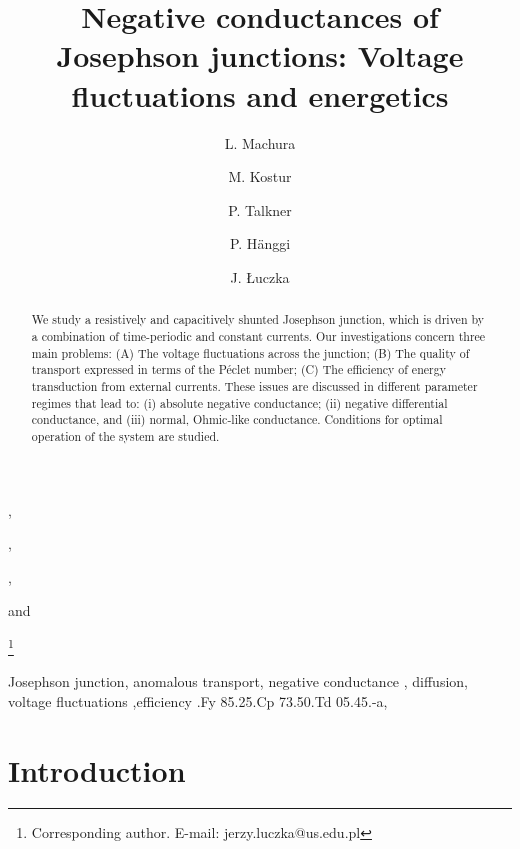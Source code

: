 \documentclass{physeauth}
\begin{document}
 


\begin{frontmatter}


\title{Negative conductances of  Josephson junctions:  Voltage fluctuations and energetics} 

\author[sil]{L. Machura}, 
\author[sil]{M.  Kostur}, 
\author[aug]{P. Talkner}, 
\author[aug]{P. H{\"a}nggi} and 
\author[sil]{J. {\L}uczka }

\address[sil]{Institute of Physics, University of Silesia, 40-007 Katowice, Poland}
\address[aug] {Institute of Physics, University of Augsburg,
D-86135 Augsburg, Germany}


\thanks[thank1]{
Corresponding author. 
E-mail: jerzy.luczka@us.edu.pl}





\begin{abstract}
We study a resistively and capacitively 
shunted Josephson junction,
which is driven by a combination of time-periodic and constant
currents.  Our investigations concern three main problems: (A) The voltage
fluctuations across the junction;  (B) The quality of transport expressed in terms of the P\'eclet number;   (C) The efficiency of energy transduction  
from external  currents. These issues are discussed in different
parameter regimes that lead to: (i) absolute negative
conductance; (ii) negative differential
conductance, and (iii) normal, Ohmic-like conductance.  Conditions for optimal operation 
of the system are studied. 

\end{abstract}

\begin{keyword}
Josephson junction, anomalous transport, negative conductance \sep 
diffusion, voltage fluctuations  
\sep efficiency  
.Fy %
85.25.Cp %
73.50.Td    %
05.45.-a, %
\end{keyword}
\end{frontmatter}





\section{Introduction}
\end{document}
